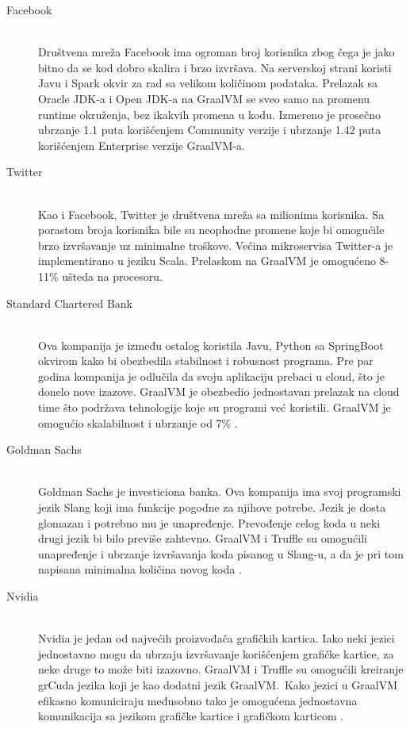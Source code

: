 \documentclass[a4paper]{article}
\begin{document}
\begin{description}
	\item[Facebook] \hfill \\
	Društvena mreža Facebook ima ogroman broj korisnika zbog čega je jako bitno da se kod dobro skalira i brzo izvršava.
	Na serverskoj strani koristi Javu i Spark okvir za rad sa velikom količinom podataka. Prelazak sa Oracle JDK-a i Open JDK-a na GraalVM se sveo samo na promenu runtime okruženja, bez ikakvih promena u kodu. Izmereno je prosečno ubrzanje 1.1 puta korišćenjem Community verzije i ubrzanje 1.42 puta korišćenjem Enterprise verzije GraalVM-a. \cite{graalvmusecases}
	
	\item[Twitter] \hfill \\
	Kao i Facebook, Twitter je društvena mreža sa milionima korisnika. Sa porastom broja korisnika bile su neophodne promene koje bi omogućile brzo izvršavanje uz minimalne troškove. Većina mikroservisa Twitter-a je implementirano u jeziku Scala. Prelaskom na GraalVM je omogućeno 8-11\% ušteda na procesoru. \cite{graalvmusecases}	
	
	\item[Standard Chartered Bank] \hfill \\
	Ova kompanija je između ostalog koristila Javu, Python sa SpringBoot okvirom kako bi obezbedila stabilnost i robusnost programa. Pre par godina kompanija je odlučila da svoju aplikaciju prebaci u cloud, što je donelo nove izazove. GraalVM je obezbedio jednostavan prelazak na cloud time što podržava tehnologije koje su programi već koristili. GraalVM je omogućio skalabilnost i ubrzanje od 7\% \cite{graalvmusecases}.
		
	\item[Goldman Sachs]  \hfill \\
        Goldman Sachs je investiciona banka. Ova kompanija ima svoj programski jezik Slang koji ima funkcije pogodne za njihove potrebe. Jezik je dosta glomazan i potrebno mu je unapređenje. Prevođenje celog koda u neki drugi jezik bi bilo previše zahtevno. GraalVM i Truffle su omogućili unapređenje i ubrzanje izvršavanja koda pisanog u Slang-u, a da je pri tom napisana minimalna količina novog koda \cite{graalvmusecases}.
	
	\item[Nvidia]  \hfill \\
	Nvidia je jedan od najvećih proizvođača grafičkih kartica. Iako neki jezici jednostavno mogu da ubrzaju izvršavanje korišćenjem grafičke kartice, za neke druge to može biti izazovno. GraalVM i Truffle su omogućili kreiranje grCuda jezika koji je kao dodatni jezik GraalVM.\ Kako jezici u GraalVM efikasno komuniciraju međusobno tako je omogućena jednostavna komunikacija sa jezikom grafičke kartice i grafičkom karticom \cite{graalvmusecases}.
	

\end{description}
\end{document}
